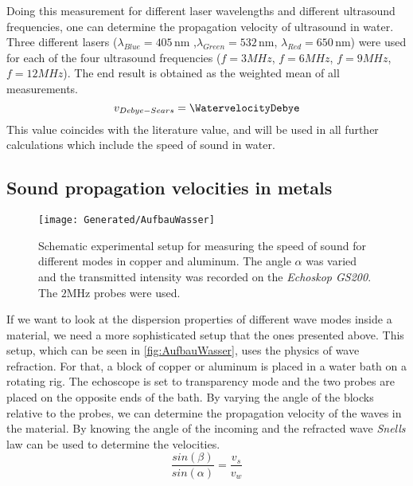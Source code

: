 \documentclass[a4paper,10pt,twocolumn]{article}
\begin{document}
    Doing this measurement for different laser wavelengths and different ultrasound frequencies, one can determine the propagation velocity of ultrasound in water.
    Three different lasers ($ \lambda_{Blue} = 405\,$nm ,$ \lambda_{Green} = 532\,$nm, $ \lambda_{Red} = 650\,$nm) were used for each of the four ultrasound frequencies ($f=3MHz$, $f=6MHz$, $f=9MHz$, $f=12MHz$).
    The end result is obtained as the weighted mean of all measurements.
    \begin{equation}\label{eq:VelocityDebyeValue}
        v_{Debye-Sears} = \WatervelocityDebye
    \end{equation}
    This value coincides with the literature value, and will be used in all further calculations which include the speed of sound in water.
    
    \subsection{Sound propagation velocities in metals}\label{propagationInMetals}
    \begin{figure}
        \begin{center}
        \texttt{[image: Generated/AufbauWasser]}
            \caption[]{Schematic experimental setup for measuring the speed of sound for different modes in copper and aluminum.
            The angle $\alpha$ was varied and the transmitted intensity was recorded on the \textit{Echoskop GS200}.
            The $2$MHz probes were used.}
            \label{fig:AufbauWasser}
        \end{center}
    \end{figure}
    If we want to look at the dispersion properties of different wave modes inside a material, we need a more sophisticated setup that the ones presented above.
    This setup, which can be seen in \autoref{fig:AufbauWasser}, uses the physics of wave refraction.
    For that, a block of copper or aluminum is placed in a water bath on a rotating rig.
    The echoscope is set to transparency mode and the two probes are placed on the opposite ends of the bath.
    By varying the angle of the blocks relative to the probes, we can determine the propagation velocity of the waves in the material.
    By knowing the angle of the incoming and the refracted wave \textit{Snells} law can be used to determine the velocities.
    \begin{equation}\label{eg:SnellLaw}
        \frac{sin(\beta)}{sin(\alpha)} = \frac{v_s}{v_w}
    \end{equation}
\end{document}
